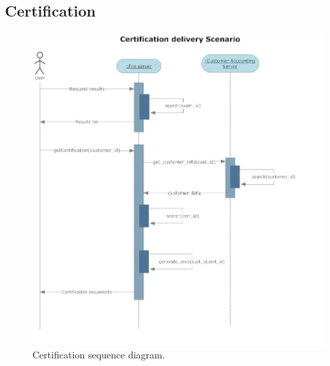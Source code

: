 \subsection{Certification}
\begin{figure}
\begin{centering}
\includegraphics[scale=0.55]{assign3/sdraw/imgs/certification.jpg}
\caption{Certification sequence diagram.}
\label{3img:[sequence]certification}
\end{centering}
\end{figure}

